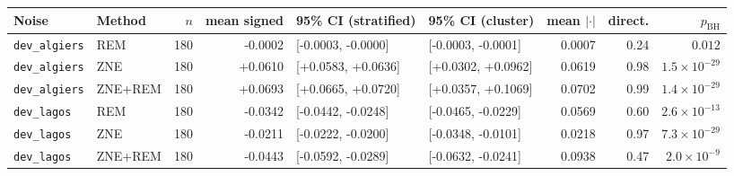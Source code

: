 \begin{tabular}{@{}llrrllrrr@{}}
\toprule
Noise & Method & $n$ & mean signed & 95\% CI (stratified) & 95\% CI (cluster) & mean $|\cdot|$ & direct. & $p_{\mathrm{BH}}$\\
\midrule
\texttt{dev\_algiers} & REM & 180 & -0.0002 & [-0.0003, -0.0000] & [-0.0003, -0.0001] & 0.0007 & 0.24 & $0.012$\\
\texttt{dev\_algiers} & ZNE & 180 & +0.0610 & [+0.0583, +0.0636] & [+0.0302, +0.0962] & 0.0619 & 0.98 & $1.5\times10^{-29}$\\
\texttt{dev\_algiers} & ZNE+REM & 180 & +0.0693 & [+0.0665, +0.0720] & [+0.0357, +0.1069] & 0.0702 & 0.99 & $1.4\times10^{-29}$\\
\texttt{dev\_lagos} & REM & 180 & -0.0342 & [-0.0442, -0.0248] & [-0.0465, -0.0229] & 0.0569 & 0.60 & $2.6\times10^{-13}$\\
\texttt{dev\_lagos} & ZNE & 180 & -0.0211 & [-0.0222, -0.0200] & [-0.0348, -0.0101] & 0.0218 & 0.97 & $7.3\times10^{-29}$\\
\texttt{dev\_lagos} & ZNE+REM & 180 & -0.0443 & [-0.0592, -0.0289] & [-0.0632, -0.0241] & 0.0938 & 0.47 & $2.0\times10^{-9}$\\
\bottomrule
\end{tabular}
